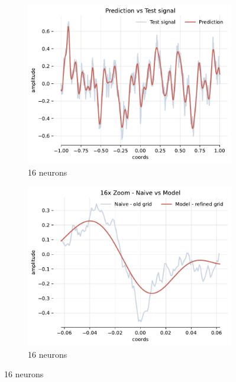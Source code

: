 \begin{figure}[h]
    \centering
    \begin{subfigure}[b]{0.32\textwidth}
        \centering
        \includegraphics[width=\textwidth]{img/ch4/pred-1hl-16hf-2hz.pdf}
        \caption{16 neurons}
        \label{fig:pred-1hl-16hf-2hz}
    \end{subfigure}
    \begin{subfigure}[b]{0.32\textwidth}
        \centering
        \includegraphics[width=\textwidth]{img/ch4/16x-zoom-1hl-16hf-2hz.pdf}
        \caption{16 neurons}
        \label{fig:16x-zoom-1hl-16hf-2hz}
    \end{subfigure}

\end{figure}
